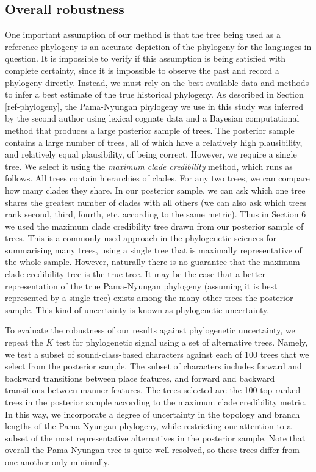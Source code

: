 \hypertarget{overall-robustness}{%
\subsection{Overall robustness}\label{overall-robustness}}

One important assumption of our method is that the tree being used as a reference phylogeny is an accurate depiction of the phylogeny for the languages in question. It is impossible to verify if this assumption is being satisfied with complete certainty, since it is impossible to observe the past and record a phylogeny directly. Instead, we must rely on the best available data and methods to infer a best estimate of the true historical phylogeny. As described in Section \ref{ref-phylogeny}, the Pama-Nyungan phylogeny we use in this study was inferred by the second author using lexical cognate data and a Bayesian computational method that produces a large posterior sample of trees. The posterior sample contains a large number of trees, all of which have a relatively high plausibility, and relatively equal plausibility, of being correct. However, we require a single tree. We select it using the \emph{maximum clade credibility} method, which runs as follows. All trees contain hierarchies of clades. For any two trees, we can compare how many clades they share. In our posterior sample, we can ask which one tree shares the greatest number of clades with all others (we can also ask which trees rank second, third, fourth, etc. according to the same metric). Thus in Section 6 we used the maximum clade credibility tree drawn from our posterior sample of trees. This is a commonly used approach in the phylogenetic sciences for summarising many trees, using a single tree that is maximally representative of the whole sample. However, naturally there is no guarantee that the maximum clade credibility tree is the true tree. It may be the case that a better representation of the true Pama-Nyungan phylogeny (assuming it is best represented by a single tree) exists among the many other trees the posterior sample. This kind of uncertainty is known as phylogenetic uncertainty.

To evaluate the robustness of our results against phylogenetic uncertainty, we repeat the \(K\) test for phylogenetic signal using a set of alternative trees. Namely, we test a subset of sound-class-based characters against each of 100 trees that we select from the posterior sample. The subset of characters includes forward and backward transitions between place features, and forward and backward transitions between manner features. The trees selected are the 100 top-ranked trees in the posterior sample according to the maximum clade credibility metric. In this way, we incorporate a degree of uncertainty in the topology and branch lengths of the Pama-Nyungan phylogeny, while restricting our attention to a subset of the most representative alternatives in the posterior sample. Note that overall the Pama-Nyungan tree is quite well resolved, so these trees differ from one another only minimally.


